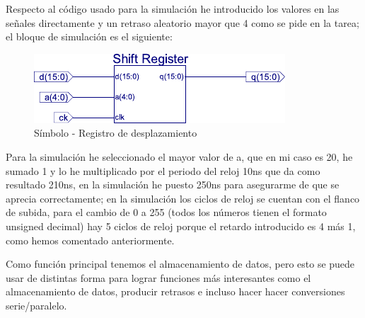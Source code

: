 \documentclass[11pt,a4paper]{article}
\begin{document}
\begin{itemize}
    Respecto al código usado para la simulación he introducido los valores en las señales directamente y un retraso aleatorio mayor que 4 como se pide en la tarea; el bloque de simulación es el siguiente:
    
    \begin{figure}[H]
        \centering
        \includegraphics[scale=1]{images/registro de desplazamiento_simbolo.pdf}
        \caption{Símbolo - Registro de desplazamiento}
    \end{figure}
  
  Para la simulación he seleccionado el mayor valor de a, que en mi caso es 20, he sumado 1 y lo he multiplicado por el periodo del reloj 10ns que da como resultado 210ns, en la simulación he puesto 250ns para asegurarme de que se aprecia correctamente; en la simulación los ciclos de reloj se cuentan con el flanco de subida, para el cambio de 0 a 255 (todos los números tienen el formato unsigned decimal) hay 5 ciclos de reloj porque el retardo introducido es 4 más 1, como hemos comentado anteriormente.
    
    Como función principal tenemos el almacenamiento de datos, pero esto se puede usar de distintas forma para lograr funciones más interesantes como el almacenamiento de datos, producir retrasos e incluso hacer hacer conversiones serie/paralelo.

\end{itemize}

% 
% 
\end{document}
